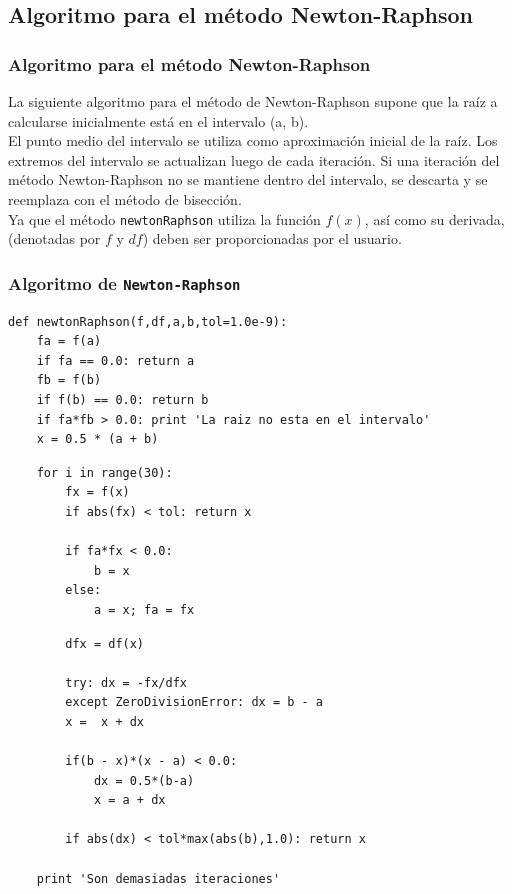 \documentclass[12pt]{beamer}
\begin{document}
\subsection{Algoritmo para el m\'{e}todo Newton-Raphson}
\begin{frame}
\frametitle{Algoritmo para el m\'{e}todo Newton-Raphson}
La siguiente algoritmo para el m\'{e}todo de Newton-Raphson supone que la ra\'{i}z a calcularse inicialmente est\'{a} en el intervalo (a, b).
\\
\medskip
El punto medio del intervalo se utiliza como aproximaci\'{o}n inicial de la ra\'{i}z. Los extremos del intervalo se actualizan luego de cada iteraci\'{o}n. Si una iteraci\'{o}n del m\'{e}todo Newton-Raphson no se mantiene dentro del intervalo, se descarta y se reemplaza
con el m\'{e}todo de bisecci\'{o}n.
\\
\medskip
Ya que el m\'{e}todo \texttt{newtonRaphson} utiliza la funci\'{o}n $f(x)$, as\'{i} como su derivada, (denotadas por $f$ y $df$) deben ser proporcionadas por
el usuario.
\end{frame}
\begin{frame}[fragile]
\frametitle{Algoritmo de \texttt{Newton-Raphson}}
\begin{lstlisting}
def newtonRaphson(f,df,a,b,tol=1.0e-9):
    fa = f(a)
    if fa == 0.0: return a
    fb = f(b)
    if f(b) == 0.0: return b
    if fa*fb > 0.0: print 'La raiz no esta en el intervalo'
    x = 0.5 * (a + b)
\end{lstlisting}
\end{frame}
\begin{frame}[fragile]
\begin{lstlisting}
    for i in range(30):
        fx = f(x)
        if abs(fx) < tol: return x

        if fa*fx < 0.0:
            b = x
        else:
            a = x; fa = fx
\end{lstlisting}
\end{frame}
\begin{frame}[fragile]
\begin{lstlisting}
        dfx = df(x)
        
        try: dx = -fx/dfx
        except ZeroDivisionError: dx = b - a
        x =  x + dx
        
        if(b - x)*(x - a) < 0.0:
            dx = 0.5*(b-a)
            x = a + dx
        
        if abs(dx) < tol*max(abs(b),1.0): return x
    
    print 'Son demasiadas iteraciones'
\end{lstlisting}
\end{frame}
\end{document}
